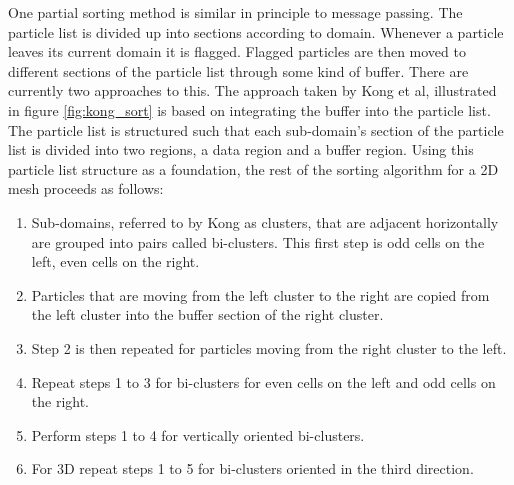 	One partial sorting method is similar in principle to message passing. The particle list is divided up into sections according to domain. Whenever a particle leaves its current domain it is flagged. Flagged particles are then moved to different sections of the particle list through some kind of buffer. There are currently two approaches to this. The approach taken by Kong et al, illustrated in figure \ref{fig:kong_sort} is based on integrating the buffer into the particle list. The particle list is structured such that each sub-domain's section of the particle list is divided into two regions, a data region and a buffer region. Using this particle list structure as a foundation, the rest of the sorting algorithm for a 2D mesh proceeds as follows\cite{Kong2011}:

\begin{enumerate}
\singlespace
\item Sub-domains, referred to by Kong as clusters, that are adjacent horizontally are grouped into pairs called bi-clusters. This first step is odd cells on the left, even cells on the right. 
\item Particles that are moving from the left cluster to the right are copied from the left cluster into the buffer section of the right cluster. 
\item Step 2 is then repeated for particles moving from the right cluster to the left. 
\item Repeat steps 1 to 3 for bi-clusters for even cells on the left and odd cells on the right. 
\item Perform steps 1 to 4 for vertically oriented bi-clusters.  
\item For 3D repeat steps 1 to 5 for bi-clusters oriented in the third direction.
\end{enumerate}


